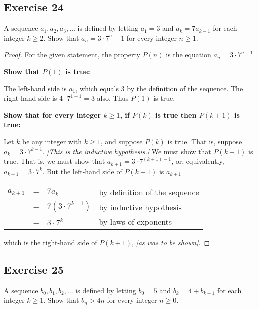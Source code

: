 \documentclass[14pt]{extarticle}
\newcommand{\cy}{\color{cyan}}
\begin{document}
\subsection{Exercise 24}
A sequence $a_1, a_2, a_3, \ldots$ is defined by letting $a_1 = 3$ and $a_k = 7a_{k-1}$ for each integer $k \geq 2$. Show that $a_n = 3\cdot 7^n - 1$ for every integer $n \geq 1$.

\begin{proof}
    For the given statement, the property $P(n)$ is the equation $a_n = 3 \cdot 7^{n - 1}$.

        {\bf Show that $P(1)$ is true:}

    The left-hand side is $a_1$, which equals 3 by the definition of the sequence. The right-hand side is $4 \cdot 7^{1 - 1} = 3$ also. Thus $P(1)$ is true.

        {\bf Show that for every integer $k \geq 1$, if $P(k)$ is true then $P(k + 1)$ is true:}

    Let $k$ be any integer with $k \geq 1$, and suppose $P(k)$ is true. That is, suppose $a_k = 3 \cdot 7^{k - 1}$. {\it [This is the inductive hypothesis.]} We must show that $P(k + 1)$ is true. That is, we must show that $a_{k + 1} = 3 \cdot 7^{(k + 1) - 1}$, or, equivalently, $a_{k + 1} = 3 \cdot 7^k$. But the left-hand side of $P(k+1)$ is $a_{k+1}$

    \begin{center}
        \begin{tabular}{rlll}
            $a_{k+1}$ & = & $7a_k$                 & {\cy by definition of the sequence} \\
                      & = & $7(3 \cdot 7^{k - 1})$ & {\cy by inductive hypothesis}       \\
                      & = & $3 \cdot 7^k$          & {\cy by laws of exponents}          \\
        \end{tabular}
    \end{center}

    which is the right-hand side of $P(k + 1)$, {\it [as was to be shown]}.
\end{proof}

\subsection{Exercise 25}
A sequence $b_0, b_1, b_2, \ldots$ is defined by letting
$b_0 = 5$ and $b_k = 4 + b_{k-1}$ for each integer $k \geq 1$. Show that $b_n > 4n$ for every integer $n \geq 0$.
\end{document}
